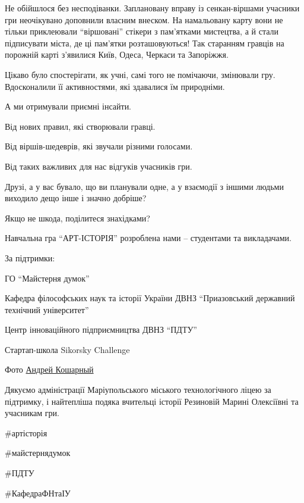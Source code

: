 Не обійшлося без несподіванки. Заплановану вправу із сенкан-віршами учасники
гри неочікувано доповнили власним внеском. На намальовану карту вони не тільки
приклеювали \enquote{віршовані} стікери з пам'ятками мистецтва, а й стали підписувати
міста, де ці пам'ятки розташовуються! Так старанням гравців на порожній карті
з'явилися Київ, Одеса, Черкаси та Запоріжжя.

Цікаво було спостерігати, як учні, самі того не помічаючи, змінювали гру.
Вдосконалили її активностями, які здавалися їм природніми.

А ми отримували приємні інсайти. 

Від нових правил, які створювали гравці. 

Від віршів-шедеврів, які звучали різними голосами. 

Від таких важливих для нас відгуків учасників гри.

Друзі, а у вас бувало, що ви планували одне, а у взаємодії з іншими людьми
виходило дещо інше і значно добріше? 

Якщо не шкода, поділитеся знахідками?

Навчальна гра \enquote{АРТ-ІСТОРІЯ} розроблена нами – студентами та викладачами.

За підтримки:

ГО \enquote{Майстерня думок}

Кафедра філософських наук та історії України ДВНЗ \enquote{Приазовський державний
технічний університет}

Центр інноваційного підприємництва ДВНЗ \enquote{ПДТУ}

Стартап-школа Sikorsky Challenge

Фото \href{https://www.facebook.com/kosharnyi.andrei}{Андрей Кошарный}

Дякуємо адміністрації Маріупольського міського технологічного ліцею за
підтримку, і найтепліша подяка вчительці історії Резиновій Марині Олексіївні та
учасникам гри.

\#артісторія

\#майстернядумок

\#ПДТУ

\#КафедраФНтаІУ

